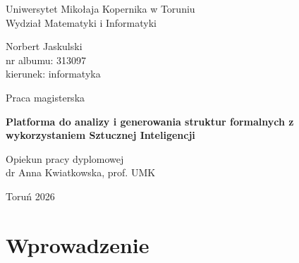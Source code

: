 \documentclass[12pt]{article}
\begin{document}

\begin{titlepage}

\vspace*{-3cm}

\begin{center}
\begin{large}
Uniwersytet Mikołaja Kopernika w Toruniu\\[1mm]
Wydział Matematyki i Informatyki
\end{large}
\end{center}

\vspace{2cm}

\begin{center}
{\Large Norbert Jaskulski}\\
nr albumu: 313097\\
kierunek: informatyka
\end{center}

\vspace{0.5cm}

\begin{center}
Praca magisterska
\end{center}

\vspace{3cm}

\begin{center}
{\Huge \textbf{Platforma do analizy i generowania struktur formalnych z wykorzystaniem Sztucznej Inteligencji}}
\end{center}

\vspace{3cm}

\hfill
\begin{minipage}{5cm}
Opiekun pracy dyplomowej\\
dr Anna Kwiatkowska, prof. UMK
\end{minipage}

\vspace{2cm}

\begin{center}
Toruń 2026
\end{center}
\end{titlepage}

\clearpage{\pagestyle{empty}\cleardoublepage}


\newpage
\tableofcontents
\newpage
\section{Wprowadzenie}
\end{document}
